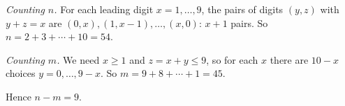 \emph{Counting $n$.} For each leading digit $x=1,\ldots,9$, the pairs of digits $(y,z)$ with $y+z=x$ are $(0,x),(1,x-1),\ldots,(x,0)$: $x+1$ pairs. So $n=2+3+\cdots+10=54$.

\emph{Counting $m$.} We need $x\ge1$ and $z=x+y\le9$, so for each $x$ there are $10-x$ choices $y=0,\ldots,9-x$. So $m=9+8+\cdots+1=45$.

Hence $n-m=\boxed{9}$.

